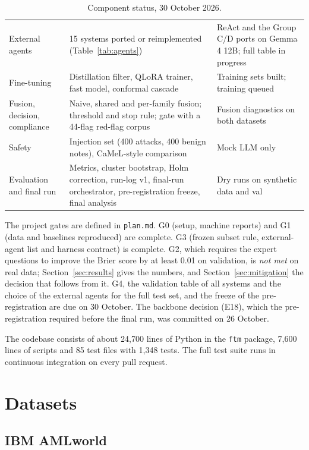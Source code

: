 \documentclass[11pt,a4paper]{article}
\begin{document}
\begin{table}[!htbp]
\begin{tabularx}{\textwidth}{@{}p{3.6cm}LL@{}}
External agents & 15 systems ported or reimplemented (Table~\ref{tab:agents}) & ReAct and the Group C/D ports on Gemma 4 12B; full table in progress \\
Fine-tuning & Distillation filter, QLoRA trainer, fast model, conformal cascade & Training sets built; training queued \\
Fusion, decision, compliance & Naive, shared and per-family fusion; threshold and stop rule; gate with a 44-flag red-flag corpus & Fusion diagnostics on both datasets \\
Safety & Injection set (400 attacks, 400 benign notes), CaMeL-style comparison & Mock LLM only \\
Evaluation and final run & Metrics, cluster bootstrap, Holm correction, run-log v1, final-run orchestrator, pre-registration freeze, final analysis & Dry runs on synthetic data and val \\
\bottomrule
\end{tabularx}
\caption{Component status, 30 October 2026.}
\label{tab:progress}
\end{table}

The project gates are defined in \texttt{plan.md}. G0 (setup, machine reports) and G1 (data and baselines reproduced) are complete. G3 (frozen subset rule, external-agent list and harness contract) is complete. G2, which requires the expert questions to improve the Brier score by at least 0.01 on validation, is \emph{not met} on real data; Section~\ref{sec:results} gives the numbers, and Section~\ref{sec:mitigation} the decision that follows from it. G4, the validation table of all systems and the choice of the external agents for the full test set, and the freeze of the pre-registration are due on 30 October. The backbone decision (E18), which the pre-registration required before the final run, was committed on 26 October.

The codebase consists of about 24,700 lines of Python in the \texttt{ftm} package, 7,600 lines of scripts and 85 test files with 1,348 tests. The full test suite runs in continuous integration on every pull request.

\section{Datasets}

\subsection{IBM AMLworld}
\end{document}
